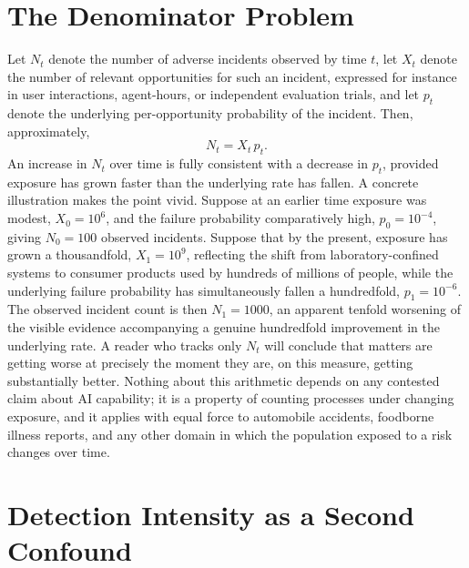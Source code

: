 \documentclass[11pt]{article}
\begin{document}
\section{The Denominator Problem}

Let $N_t$ denote the number of adverse incidents observed by time $t$, let $X_t$ denote the number of relevant opportunities for such an incident, expressed for instance in user interactions, agent-hours, or independent evaluation trials, and let $p_t$ denote the underlying per-opportunity probability of the incident. Then, approximately,
\[
N_t = X_t \, p_t .
\]
An increase in $N_t$ over time is fully consistent with a decrease in $p_t$, provided exposure has grown faster than the underlying rate has fallen. A concrete illustration makes the point vivid. Suppose at an earlier time exposure was modest, $X_0 = 10^{6}$, and the failure probability comparatively high, $p_0 = 10^{-4}$, giving $N_0 = 100$ observed incidents. Suppose that by the present, exposure has grown a thousandfold, $X_1 = 10^{9}$, reflecting the shift from laboratory-confined systems to consumer products used by hundreds of millions of people, while the underlying failure probability has simultaneously fallen a hundredfold, $p_1 = 10^{-6}$. The observed incident count is then $N_1 = 1000$, an apparent tenfold worsening of the visible evidence accompanying a genuine hundredfold improvement in the underlying rate. A reader who tracks only $N_t$ will conclude that matters are getting worse at precisely the moment they are, on this measure, getting substantially better. Nothing about this arithmetic depends on any contested claim about AI capability; it is a property of counting processes under changing exposure, and it applies with equal force to automobile accidents, foodborne illness reports, and any other domain in which the population exposed to a risk changes over time.

\section{Detection Intensity as a Second Confound}
\end{document}
